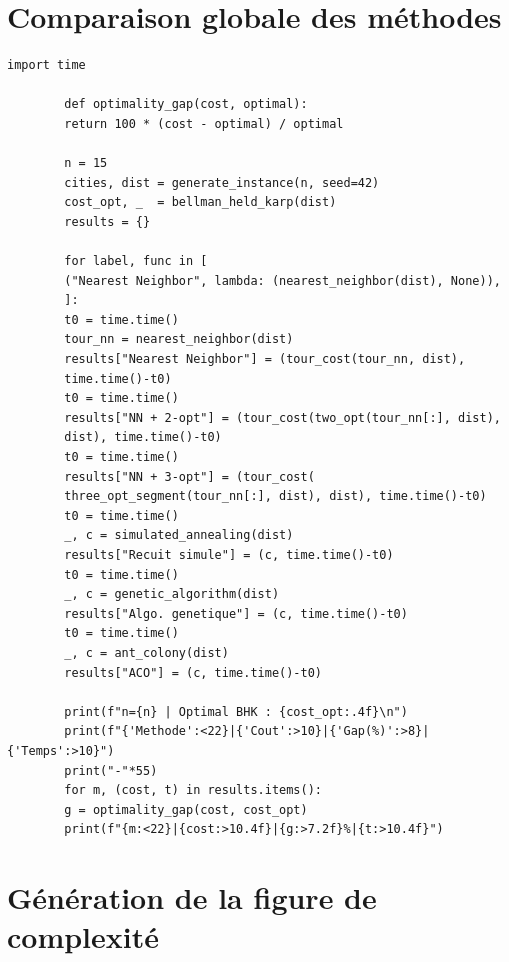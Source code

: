 \documentclass[12pt, a4paper, twoside, openright]{book}
\begin{document}
	\section{Comparaison globale des méthodes}
	\label{ann:comparaison}
	
	\begin{lstlisting}[caption={Tableau comparatif de toutes les méthodes sur une instance euclidienne à $n$ villes.}, label={lst:comparaison}]
		import time
		
		def optimality_gap(cost, optimal):
		return 100 * (cost - optimal) / optimal
		
		n = 15
		cities, dist = generate_instance(n, seed=42)
		cost_opt, _  = bellman_held_karp(dist)
		results = {}
		
		for label, func in [
		("Nearest Neighbor", lambda: (nearest_neighbor(dist), None)),
		]:
		t0 = time.time()
		tour_nn = nearest_neighbor(dist)
		results["Nearest Neighbor"] = (tour_cost(tour_nn, dist),
		time.time()-t0)
		t0 = time.time()
		results["NN + 2-opt"] = (tour_cost(two_opt(tour_nn[:], dist),
		dist), time.time()-t0)
		t0 = time.time()
		results["NN + 3-opt"] = (tour_cost(
		three_opt_segment(tour_nn[:], dist), dist), time.time()-t0)
		t0 = time.time()
		_, c = simulated_annealing(dist)
		results["Recuit simule"] = (c, time.time()-t0)
		t0 = time.time()
		_, c = genetic_algorithm(dist)
		results["Algo. genetique"] = (c, time.time()-t0)
		t0 = time.time()
		_, c = ant_colony(dist)
		results["ACO"] = (c, time.time()-t0)
		
		print(f"n={n} | Optimal BHK : {cost_opt:.4f}\n")
		print(f"{'Methode':<22}|{'Cout':>10}|{'Gap(%)':>8}|{'Temps':>10}")
		print("-"*55)
		for m, (cost, t) in results.items():
		g = optimality_gap(cost, cost_opt)
		print(f"{m:<22}|{cost:>10.4f}|{g:>7.2f}%|{t:>10.4f}")
	\end{lstlisting}
	
	\section{Génération de la figure de complexité}
	\label{ann:figures}
	
\end{document}
